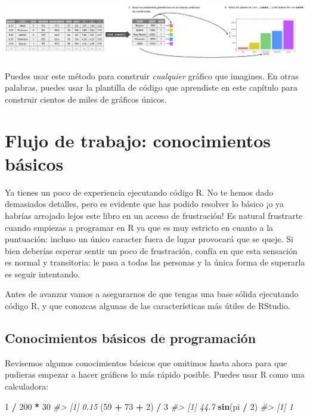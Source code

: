 \documentclass[11pt,oneside]{report}
\newenvironment{Shaded}{\begin{snugshade}}{\end{snugshade}}
\newcommand{\CommentTok}[1]{\textcolor[rgb]{0.56,0.35,0.01}{\textit{#1}}}
\newcommand{\DecValTok}[1]{\textcolor[rgb]{0.00,0.00,0.81}{#1}}
\newcommand{\KeywordTok}[1]{\textcolor[rgb]{0.13,0.29,0.53}{\textbf{#1}}}
\newcommand{\NormalTok}[1]{#1}
\newcommand{\OperatorTok}[1]{\textcolor[rgb]{0.81,0.36,0.00}{\textbf{#1}}}
\newcommand{\StringTok}[1]{\textcolor[rgb]{0.31,0.60,0.02}{#1}}
\begin{document}
\begin{center}\includegraphics[width=1\linewidth]{diagrams_pdf/es/visualization-grammar-3} \end{center}

Puedes usar este método para construir \emph{cualquier} gráfico que
imagines. En otras palabras, puedes usar la plantilla de código que
aprendiste en este capítulo para construir cientos de miles de gráficos
únicos.

\hypertarget{flujo-de-trabajo-conocimientos-buxe1sicos}{%
\chapter{Flujo de trabajo: conocimientos
básicos}\label{flujo-de-trabajo-conocimientos-buxe1sicos}}

Ya tienes un poco de experiencia ejecutando código R. No te hemos dado
demasiados detalles, pero es evidente que has podido resolver lo básico
¡o ya habrías arrojado lejos este libro en un acceso de frustración! Es
natural frustrarte cuando empiezas a programar en R ya que es muy
estricto en cuanto a la puntuación: incluso un único caracter fuera de
lugar provocará que se queje. Si bien deberías esperar sentir un poco de
frustración, confía en que esta sensación es normal y transitoria: le
pasa a todas las personas y la única forma de superarla es seguir
intentando.

Antes de avanzar vamos a asegurarnos de que tengas una base sólida
ejecutando código R, y que conozcas algunas de las características más
útiles de RStudio.

\hypertarget{conocimientos-buxe1sicos-de-programaciuxf3n}{%
\section{Conocimientos básicos de
programación}\label{conocimientos-buxe1sicos-de-programaciuxf3n}}

Revisemos algunos conocimientos básicos que omitimos hasta ahora para
que pudieras empezar a hacer gráficos lo más rápido posible. Puedes usar
R como una calculadora:

\begin{Shaded}
\begin{Highlighting}[]
\DecValTok{1} \OperatorTok{/}\StringTok{ }\DecValTok{200} \OperatorTok{*}\StringTok{ }\DecValTok{30}
\CommentTok{#> [1] 0.15}
\NormalTok{(}\DecValTok{59} \OperatorTok{+}\StringTok{ }\DecValTok{73} \OperatorTok{+}\StringTok{ }\DecValTok{2}\NormalTok{) }\OperatorTok{/}\StringTok{ }\DecValTok{3}
\CommentTok{#> [1] 44.7}
\KeywordTok{sin}\NormalTok{(pi }\OperatorTok{/}\StringTok{ }\DecValTok{2}\NormalTok{)}
\CommentTok{#> [1] 1}
\end{Highlighting}
\end{Shaded}
\end{document}
